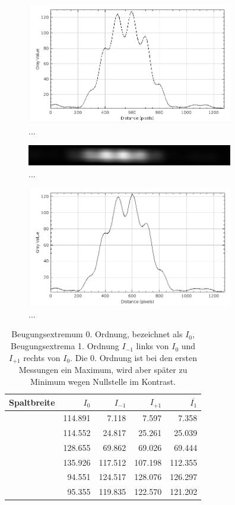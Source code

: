 \documentclass{article}
\begin{document}
\begin{figure}[H]
\centering
\caption{...}
\includegraphics[width=9cm]{moodle/img6_graph.png}
\end{figure}





\begin{figure}[H]
\centering
\caption{...}
\includegraphics[width=9cm]{moodle/img7.png}
\end{figure}

\begin{figure}[H]
\centering
\caption{...}
\includegraphics[width=9cm]{moodle/img7_graph.png}
\end{figure}



\begin{table}[H]
\caption{Beugungsextremum 0. Ordnung, bezeichnet als $I_0$, Beugungsextrema 1. Ordnung $I_{-1}$ links von $I_0$ und $I_{+1}$ rechts von $I_0$. Die 0. Ordnung ist bei den ersten Messungen ein Maximum, wird aber später zu Minimum wegen Nullstelle im Kontrast.}
\begin{tabular}{l|rrrr}
Spaltbreite & $I_0$ & $I_{-1}$ & $I_{+1}$ & $\overline{I_{1}}$ \\
\hline
 & 114.891 & 7.118 & 7.597 & 7.358 \\
 & 114.552 & 24.817 & 25.261 & 25.039 \\
 & 128.655 & 69.862 & 69.026 & 69.444 \\
 & 135.926 & 117.512 & 107.198 & 112.355 \\
 & 94.551 & 124.517 & 128.076 & 126.297 \\
 & 95.355 &  119.835 & 122.570 & 121.202
\end{tabular}
\end{table}
\end{document}
